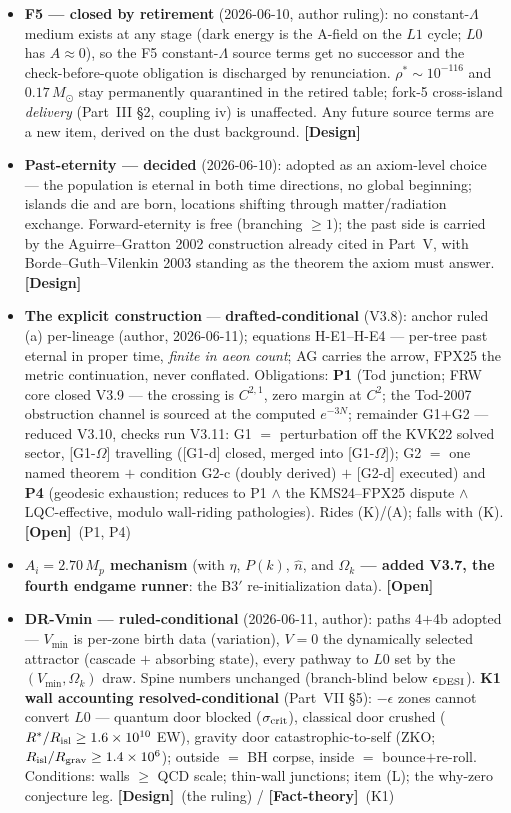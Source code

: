 \documentclass[11pt]{article}
\newcommand{\factth}{\textcolor{green!40!black}{\textbf{[Fact-theory]}}}
\newcommand{\design}{\textcolor{blue!60!black}{\textbf{[Design]}}}
\newcommand{\open}{\textcolor{red!70!black}{\textbf{[Open]}}}
\begin{document}
\begin{itemize}[leftmargin=2.6em,itemsep=3pt]
\item[\textbf{(G)}] \textbf{F5 --- closed by retirement} (2026-06-10, author ruling): no constant-$\Lambda$ medium exists at any stage (dark energy is the A-field on the $L1$ cycle; $L0$ has $A\approx0$), so the F5 constant-$\Lambda$ source terms get no successor and the check-before-quote obligation is discharged by renunciation. $\rho^*\sim10^{-116}$ and $0.17\,M_\odot$ stay permanently quarantined in the retired table; fork-5 cross-island \emph{delivery} (Part~III \S2, coupling iv) is unaffected. Any future source terms are a new item, derived on the dust background. \design
\item[\textbf{(H)}] \textbf{Past-eternity --- decided} (2026-06-10): adopted as an axiom-level choice --- the population is eternal in both time directions, no global beginning; islands die and are born, locations shifting through matter/radiation exchange. Forward-eternity is free (branching $\ge1$); the past side is carried by the Aguirre--Gratton 2002 construction already cited in Part~V, with Borde--Guth--Vilenkin 2003 standing as the theorem the axiom must answer. \design
\item[\textbf{(H1)}] \textbf{The explicit construction} --- \textbf{drafted-conditional} (V3.8): anchor ruled (a) per-lineage (author, 2026-06-11); equations H-E1--H-E4 --- per-tree past eternal in proper time, \emph{finite in aeon count}; AG carries the arrow, FPX25 the metric continuation, never conflated. Obligations: \textbf{P1} (Tod junction; FRW core closed V3.9 --- the crossing is $C^{2,1}$, zero margin at $C^2$; the Tod-2007 obstruction channel is sourced at the computed $e^{-3N}$; remainder G1$+$G2 --- reduced V3.10, checks run V3.11: G1 $=$ perturbation off the KVK22 solved sector, [G1-$\Omega$] travelling ([G1-d] closed, merged into [G1-$\Omega$]); G2 $=$ one named theorem $+$ condition G2-c (doubly derived) $+$ [G2-d] executed) and \textbf{P4} (geodesic exhaustion; reduces to P1 $\wedge$ the KMS24--FPX25 dispute $\wedge$ LQC-effective, modulo wall-riding pathologies). Rides (K)/(A); falls with (K). \open\ (P1, P4)
\item[\textbf{(I)}] \textbf{$A_i=2.70\,M_p$ mechanism} (with $\eta$, $P(k)$, $\hat n$, and \textbf{$\Omega_k$ --- added V3.7, the fourth endgame runner}: the B3$'$ re-initialization data). \open
\item[\textbf{(K)}] \textbf{DR-Vmin --- ruled-conditional} (2026-06-11, author): paths 4$+$4b adopted --- $V_{\min}$ is per-zone birth data (variation), $V=0$ the dynamically selected attractor (cascade $+$ absorbing state), every pathway to $L0$ set by the $(V_{\min},\Omega_k)$ draw. Spine numbers unchanged (branch-blind below $\epsilon_{\rm DESI}$). \textbf{K1 wall accounting resolved-conditional} (Part~VII \S5): $-\epsilon$ zones cannot convert $L0$ --- quantum door blocked ($\sigma_{\rm crit}$), classical door crushed ($R^*/R_{\rm isl}\ge1.6\times10^{10}$ EW), gravity door catastrophic-to-self (ZKO; $R_{\rm isl}/R_{\rm grav}\ge1.4\times10^{6}$); outside $=$ BH corpse, inside $=$ bounce$+$re-roll. Conditions: walls $\ge$ QCD scale; thin-wall junctions; item (L); the why-zero conjecture leg. \design\ (the ruling) / \factth\ (K1)

\end{itemize}
\end{document}
